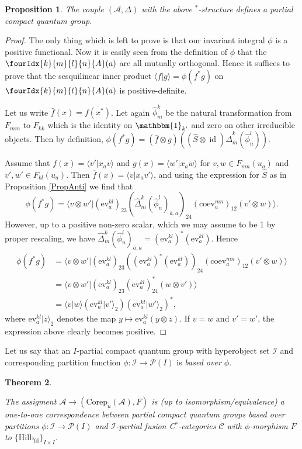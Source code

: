 \documentclass[10pt]{article}
\DeclareMathOperator{\fin}{\mathrm{fd}}
\DeclareMathOperator{\id}{id}
\newcommand{\Corep}{\mathrm{Corep}}
\newcommand{\CatCC}{\mathscr{C}}
\newcommand{\Hilb}{\mathrm{Hilb}}
\newcommand{\ev}{\mathrm{ev}}
\newcommand{\coev}{\mathrm{coev}}
\newcommand{\Unitb}{\mathbbm{1}}
\newcommand{\Gr}[5]{\fourIdx{#2}{#4}{#3}{#5}{#1}}%
\newtheorem{Theorem}{Theorem}[section]
\newtheorem{Prop}[Theorem]{Proposition}
\theoremstyle{definition}
\numberwithin{equation}{section}
\begin{document}
\begin{Prop} The couple $(\mathscr{A},\Delta)$ with the above $^*$-structure defines a partial compact quantum group.
\end{Prop}
\begin{proof} The only thing which is left to prove is that our
  invariant integral $\phi$ is a positive functional. Now it is easily
  seen from the definition of $\phi$ that the $\Gr{A}{k}{l}{m}{n}(a)$
  are all mutually orthogonal. Hence it suffices to prove that the
  sesquilinear inner product $\langle f| g\rangle = \phi(f^*g)$ on
  $\Gr{A}{k}{l}{m}{n}(a)$ is positive-definite.

  Let us write $\bar{f}(x) = \overline{f(x^*)}$. Let again
  $\hat{\phi}^k_m$ be the natural transformation from $F_{mm}$ to
  $F_{kk}$ which is the identity on $\Unitb_{k'}$ and zero on other
  irreducible objects. Then by definition, $\phi(f^*g) =
  (\bar{f}\otimes g)((\hat{S}\otimes
  \id)\hat{\Delta}^k_m(\hat{\phi}^l_n)).$

Assume  that $f(x) = \langle v'| x_a v\rangle$ and
  $g(x) = \langle w' | x_aw\rangle$ for $v,w\in F_{mn}(u_a)$ and
  $v',w'\in F_{kl}(u_a)$. Then
  $\overline{f}(x) = \langle v|x_{a} v'\rangle$, and
 using the expression for $\hat{S}$ as
  in Proposition \ref{PropAnti} we find that
  \[
    \phi(f^*g) = \langle v \otimes w'|
    (\ev_{a}^{kl})_{23} 
    (\hat\Delta^{k}_{m}(\hat \phi^{l}_{n})_{\bar a, a})_{24} 
    (\coev^{mn}_{a})_{12} (v'\otimes
    w)\rangle.\]
  However, up to a positive non-zero scalar, which we may assume to be
  1 by proper rescaling, we
  have $\hat{\Delta}^k_m(\hat{\phi}^l_n)_{\bar{a}, a} =
  (\ev^{kl}_{a})^{*}(\ev^{kl}_{a}).$ Hence
  \begin{align*}
    \phi(f^*g) &=
\langle v \otimes w'|     (\ev^{kl}_{a})_{23}  (
  (\ev^{kl}_{a})^{*}(\ev^{kl}_{a}))_{24}
 (\coev^{mn}_{a})_{12} (v'\otimes w)\rangle \\
&= \langle v \otimes w'|        (\ev^{kl}_{a})_{23} 
  (\ev^{kl}_{a})^{*}_{24}
 (w\otimes v')\rangle \\
    &= \langle v|w\rangle (\ev^{kl}_{a}|v'\rangle_{2})
    (\ev_{a}^{kl}|w'\rangle_{2})^{*},
  \end{align*}
where $\ev_{a}^{kl}|z\rangle_{2}$ denotes the map $y \mapsto
\ev_{a}^{kl}(y\otimes z)$.
If $v=w$ and $v'=w'$, the expression above clearly becomes positive.
\end{proof} 


Let us say that an $I$-partial compact quantum group with hyperobject set
$\mathscr{I}$ and corresponding partition function $\phi \colon \mathscr{I} \to
\mathscr{P}(I)$  is \emph{based over $\phi$}.
\begin{Theorem} \label{TheoTKPCQG}

The assigment $\mathscr{A}\rightarrow (\Corep_u(\mathscr{A}),F)$ is (up to isomorphism/equivalence) a one-to-one correspondence between partial compact quantum groups based over partitions $\phi:\mathscr{I}\rightarrow \mathscr{P}(I)$ and $\mathscr{I}$-partial fusion C$^*$-categories $\CatCC$ with $\phi$-morphism $F$ to $\{\Hilb_{\fin}\}_{I\times I}$.
\end{Theorem} 
\end{document}
